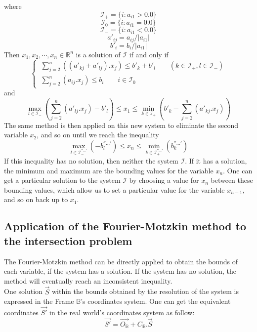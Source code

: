 \documentclass[12pt, a4paper]{article}
\begin{document}
where 
$$\mathcal{I}_+=\{i:a_{i1}>0.0\}$$
$$\mathcal{I}_0=\{i:a_{i1}=0.0\}$$
$$\mathcal{I}_-=\{i:a_{i1}<0.0\}$$
$$a'_{ij}=a_{ij}/|a_{i1}|$$
$$b'_i=b_i/|a_{i1}|$$
Then $x_1, x_2, \cdots, x_n\in\mathbb{R}^n$ is a solution of $\mathcal{I}$ if and only if
\begin{equation}
\left\{\
\begin{array}{c}
\sum_{j=2}^n((a'_{kj}+a'_{lj}).x_j)\le b'_k+b'_l \qquad (k\in\mathcal{I}_+, l\in\mathcal{I}_-)\\
\sum_{j=2}^n(a_{ij}.x_j)\le b_i \qquad i\in\mathcal{I}_0
\end{array}
\right.
\end{equation}
and
\begin{equation}
\max_{l\in\mathcal{I}_-}(\sum_{j=2}^n(a'_{lj}.x_j)-b'_l)\le x_1\le\min_{k\in\mathcal{I}_+}(b'_k-\sum_{j=2}^n(a'_{kj}.x_j))
\end{equation}
The same method is then applied on this new system to eliminate the second variable $x_2$, and so on until we reach the inequality
\begin{equation}
\max_{l\in\mathcal{I}^{''...'}_-}(-b^{''...'}_l)\le x_n\le\min_{k\in\mathcal{I}^{''...'}_+}(b^{''...'}_k)
\end{equation}
If this inequality has no solution, then neither the system $\mathcal{I}$. If it has a solution, the minimum and maximum are the bounding values for the variable $x_n$. One can get a particular solution to the system $\mathcal{I}$ by choosing a value for $x_n$ between these bounding values, which allow us to set a particular value for the variable $x_{n-1}$, and so on back up to $x_1$. 

\subsection{Application of the Fourier-Motzkin method to the intersection problem}

The Fourier-Motzkin method can be directly applied to obtain the bounds of each variable, if the system has a solution. If the system has no solution, the method will eventually reach an inconsistent inequality.\\

One solution $\overrightarrow{S}$ within the bounds obtained by the resolution of the system is expressed in the Frame $\mathbb{B}$'s coordinates system. One can get the equivalent coordinates $\overrightarrow{S'}$ in the real world's coordinates system as follow:
\begin{equation}
\overrightarrow{S'}=\overrightarrow{O_\mathbb{B}}+C_\mathbb{B}.\overrightarrow{S}
\end{equation}
\end{document}
